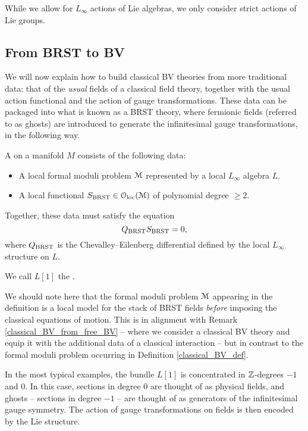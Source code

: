 \documentclass[10pt, oneside]{article}
\begin{document}
\begin{remark}
While we allow for $L_\infty$ actions of Lie algebras, we only consider strict actions of Lie groups.
\end{remark}

\subsection{From BRST to BV}
We will now explain how to build classical BV theories from more traditional data: that of the \emph{usual} fields of a classical field theory, together with the usual action functional and the action of gauge transformations.  These data can be packaged into what is known as a BRST theory, where fermionic fields (referred to as ghosts) are introduced to generate the infinitesimal gauge transformations, in the following way.

\begin{definition}
A  on a manifold $M$ consists of the following data:
\begin{itemize}
\item A local formal moduli problem $\mathcal M$ represented by a local $L_\infty$ algebra $L$.
\item A local functional $S_{\mathrm{BRST}} \in \mathcal{O}_{\rm loc}(\mathcal M)$ of polynomial degree $\geq 2$.
\end{itemize}
Together, these data must satisfy the equation
\[Q_{\mathrm{BRST}} S_{\mathrm{BRST}} = 0,\]
where $Q_{\mathrm{BRST}}$ is the Chevalley--Eilenberg differential defined by the local $L_\infty$ structure on $L$.
\end{definition}

We call $L[1]$ the .

\begin{remark}
We should note here that the formal moduli problem $\mathcal M$ appearing in the definition is a local model for the stack of BRST fields \emph{before} imposing the classical equations of motion.  This is in alignment with Remark \ref{classical_BV_from_free_BV} -- where we consider a classical BV theory and equip it with the additional data of a classical interaction -- but in contrast to the formal moduli problem occurring in Definition \ref{classical_BV_def}.
\end{remark}

\begin{remark}
In the most typical examples, the bundle $L[1]$ is concentrated in $\mathbb Z$-degrees $-1$ and 0.  In this case, sections in degree 0 are thought of as physical fields, and ghosts -- sections in degree $-1$ -- are thought of as generators of the infinitesimal gauge symmetry.  The action of gauge transformations on fields is then encoded by the Lie structure.
\end{remark}
\end{document}
